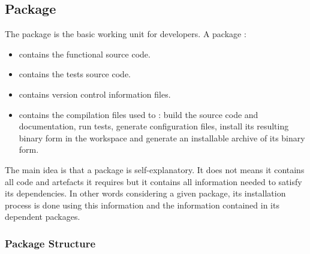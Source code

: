 \documentclass[12pt,a4paper]{article}
\begin{document}
\subsection{Package}

The package is the basic working unit for developers. A package :
\begin{itemize}
\item contains the functional source code.
\item contains the tests source code.
\item contains version control information files.
\item contains the compilation files used to : build the source code and documentation, run tests, generate configuration files, install its resulting binary form in the workspace and generate an installable archive of its binary form.
\end{itemize}

The main idea is that a package is self-explanatory. It does not means it contains all code and artefacts it requires but it contains all information needed to satisfy its dependencies. In other words considering a given package, its installation process is done using this information and the information contained in its dependent packages.

\subsubsection{Package Structure}
\end{document}
